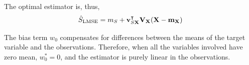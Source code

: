 {The optimal estimator is, thus,
\begin{align}
\label{Est:slmse}
\hat{S}_	\text{LMSE} 
	= m_S + {\bf v}_{S{\bf X}}^\intercal {\bf V}_{\bf X} ({\bf X}-{\bf m}_{\bf X})
\end{align}}

The bias term $w_0$ compensates for differences between the means of the target variable and the observations. Therefore, when all the variables involved have zero mean, $w_0^* = 0$, and the estimator is purely linear in the observations.



%
%



